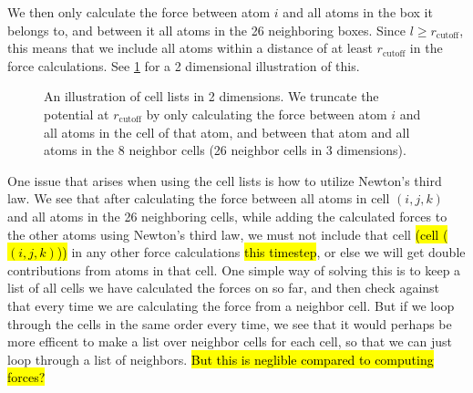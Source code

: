 We then only calculate the force between atom $i$ and all atoms in the box it belongs to, and between it all atoms in the 26 neighboring boxes. Since $l\geq r_\text{cutoff}$, this means that we include all atoms within a distance of at least $r_\text{cutoff}$ in the force calculations. See \cref{fig:cell_lists} for a 2 dimensional illustration of this.
\begin{figure}[htpb]%
    \centering%
    \caption{%
        An illustration of cell lists in 2 dimensions. We truncate the potential at $r_\text{cutoff}$ by only calculating the force between atom $i$ and all atoms in the cell of that atom, and between that atom and all atoms in the 8 neighbor cells (26 neighbor cells in 3 dimensions). %
        \label{fig:cell_lists}%
    }%
\end{figure}%

One issue that arises when using the cell lists is how to utilize Newton's third law. We see that after calculating the force between all atoms in cell $(i,j,k)$ and all atoms in the 26 neighboring cells, while adding the calculated forces to the other atoms using Newton's third law, we must not include that cell \hl{(cell ($(i,j,k)$))} in any other force calculations \hl{this timestep}, or else we will get double contributions from atoms in that cell. One simple way of solving this is to keep a list of all cells we have calculated the forces on so far, and then check against that every time we are calculating the force from a neighbor cell. But if we loop through the cells in the same order every time, we see that it would perhaps be more efficent to make a list over neighbor cells for each cell, so that we can just loop through a list of neighbors. \hl{But this is neglible compared to computing forces?}

